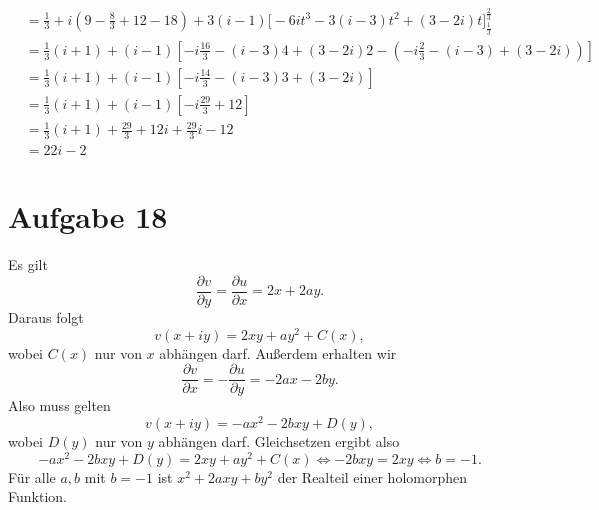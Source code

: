 \documentclass{article}
\theoremstyle{definition}
\newcommand{\equals}{\Longleftrightarrow}
\begin{document}
\begin{enumerate}[(a)]
\begin{align*}
		&= \frac{1}{3} + i \left(9 -\frac{8}{3} + 12 - 18\right)+ 3(i-1)  \bigg[-6it^3 - 3(i-3)t^2 + (3-2i)t\bigg]_\frac{1}{3}^\frac{2}{3}\\
		&= \frac{1}{3}(i+1) + (i-1) \left[-i \frac{16}{3} -(i-3)4 + (3-2i)2 - \left(-i \frac{2}{3} -(i-3) + (3-2i)\right) \right]\\
		&= \frac{1}{3}(i+1) + (i-1) \left[-i \frac{14}{3} -(i-3)3 + (3-2i)\right]\\
		&= \frac{1}{3}(i+1) + (i-1) \left[-i \frac{29}{3}+12\right]\\
		&= \frac{1}{3}(i+1) + \frac{29}{3} + 12 i + \frac{29}{3}i - 12\\
		&= 22i -2
	\end{align*}
\end{enumerate}

\section*{Aufgabe 18}
Es gilt $$\frac{\partial v}{\partial y} = \frac{\partial u}{\partial x} = 2x + 2ay.$$ Daraus folgt $$v(x + iy) = 2xy + ay^2 + C(x),$$ wobei $C(x)$ nur von $x$ abhängen darf. Außerdem erhalten wir $$\frac{\partial v}{\partial x} = - \frac{\partial u}{\partial y} = - 2ax - 2by.$$
Also muss gelten $$v(x + iy) = -ax^2 - 2bxy + D(y),$$ wobei $D(y)$ nur von $y$ abhängen darf. 
Gleichsetzen ergibt also $$-ax^2 - 2bxy + D(y) = 2xy + ay^2 + C(x) \equals -2bxy = 2xy \equals b = -1.$$
Für alle $a, b$ mit $b = -1$ ist $x^2 + 2axy + by^2$ der Realteil einer holomorphen Funktion.
\end{document}
